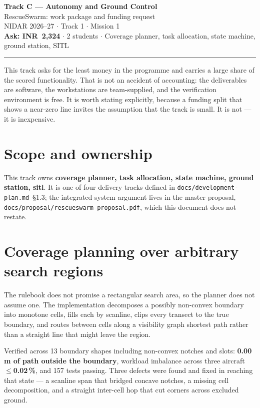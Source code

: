 \documentclass[11pt,a4paper]{article}
\newcommand{\inr}[1]{INR~#1}
\begin{document}
\begin{center}
{\LARGE\bfseries Track C --- Autonomy and Ground Control}\\[3mm]
{\large RescueSwarm: work package and funding request}\\[2mm]
NIDAR 2026--27 $\cdot$ Track 1 $\cdot$ Mission 1\\[1mm]
\textbf{Ask: \inr{2,324}} $\cdot$ 2 students $\cdot$ Coverage planner, task allocation, state machine, ground station, SITL
\end{center}
\vspace{2mm}\hrule\vspace{4mm}


This track asks for the least money in the programme and carries a large share
of the scored functionality. That is not an accident of accounting: the
deliverables are software, the workstations are team-supplied, and the
verification environment is free. It is worth stating explicitly, because a
funding split that shows a near-zero line invites the assumption that the track
is small. It is not --- it is inexpensive.

\section{Scope and ownership}

This track owns \textbf{coverage planner, task allocation, state machine, ground station, sitl}. It is one of four delivery tracks defined in
\texttt{docs/development-plan.md}~\S1.3; the integrated system argument lives in
the master proposal, \texttt{docs/proposal/rescueswarm-proposal.pdf}, which this
document does not restate.

\section{Coverage planning over arbitrary search regions}

The rulebook does not promise a rectangular search area, so the planner does not
assume one. The implementation decomposes a possibly non-convex boundary into
monotone cells, fills each by scanline, clips every transect to the true
boundary, and routes between cells along a visibility graph shortest path rather
than a straight line that might leave the region.

Verified across 13 boundary shapes including non-convex notches and slots:
\textbf{0.00\,m of path outside the boundary}, workload imbalance across three
aircraft \textbf{$\leq$0.02\,\%}, and 157 tests passing. Three defects were found
and fixed in reaching that state --- a scanline span that bridged concave
notches, a missing cell decomposition, and a straight inter-cell hop that cut
corners across excluded ground.
\end{document}
